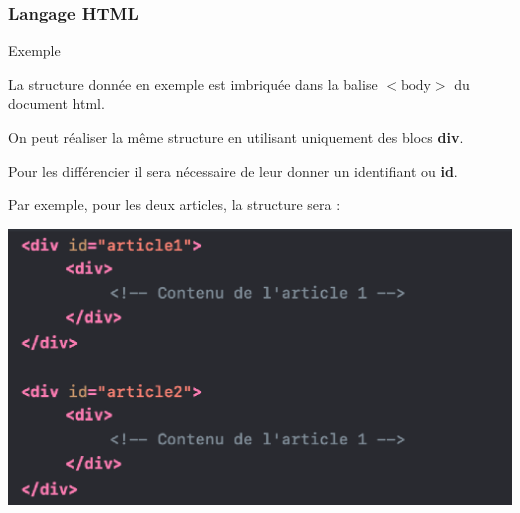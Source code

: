 \documentclass[8pt]{beamer}
\begin{document}
\begin{frame}
\frametitle{Langage HTML}

\begin{exampleblock}{Exemple}
\begin{minipage}{0.54\textwidth}
La structure donnée en exemple est imbriquée dans la balise $<\text{body}>$ du document html.

On peut réaliser la même structure en utilisant uniquement des blocs \textbf{div}. 

Pour les différencier il sera nécessaire de leur donner un identifiant ou \textbf{id}.

Par exemple, pour les deux articles, la structure sera :\medskip

\begin{center}
\includegraphics[scale=0.38]{img/exemple5-code.eps}
\end{center}


\end{minipage}
\end{exampleblock}
\end{frame}
\end{document}
